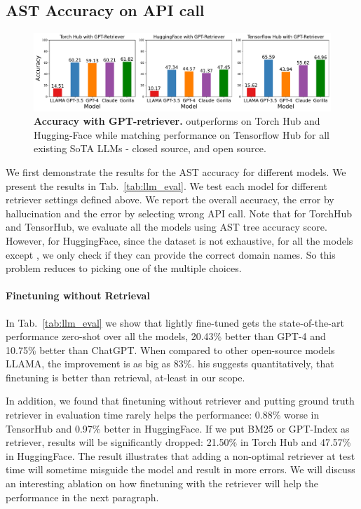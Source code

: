 \subsection{AST Accuracy on API call}

\begin{figure}[t]
    \includegraphics[width=\linewidth]{figures/grid_bars_GPT_Retrieval.pdf}
\caption{\footnotesize \textbf{Accuracy with GPT-retriever.} 
\oursmethod{} outperforms on Torch Hub and Hugging-Face while matching performance on Tensorflow Hub for all existing SoTA LLMs - closed source, and open source. }
\label{fig:images}
\end{figure}
We first demonstrate the results for the AST accuracy for different models. We present the results in Tab.~\ref{tab:llm_eval}. We test each model for different retriever settings defined above. We report the overall accuracy, the error by hallucination and the error by selecting wrong API call. Note that for TorchHub and TensorHub, we evaluate all the models using AST tree accuracy score. However, for HuggingFace, since the dataset is not exhaustive, for all the models except \oursmethod{}, we only check if they can provide the correct domain names. So this problem reduces to picking one of the multiple choices. 


\paragraph{Finetuning without Retrieval} In Tab.~\ref{tab:llm_eval} we show that lightly fine-tuned \oursmethod{} gets the state-of-the-art performance zero-shot over all the models, 20.43\% better than GPT-4 and 10.75\% better than ChatGPT. When compared to other open-source models LLAMA, the improvement is as big as 83\%. his suggests quantitatively, that finetuning is better than retrieval, at-least in our scope. 

In addition, we found that finetuning without retriever and putting ground truth retriever in evaluation time rarely helps the performance: 0.88\% worse in TensorHub and 0.97\% better in HuggingFace. If we put BM25 or GPT-Index as retriever, results will be significantly dropped: 21.50\% in Torch Hub and 47.57\% in HuggingFace. The result illustrates that adding a non-optimal retriever at test time will sometime misguide the model and result in more errors. We will discuss an interesting ablation on how finetuning with the retriever will help the performance in the next paragraph. 





